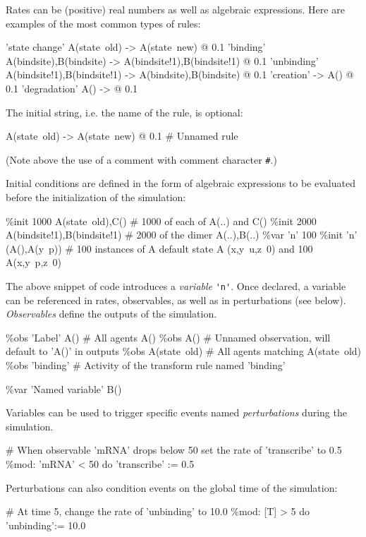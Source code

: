 \documentclass[english]{report}
\def\tbf#1{\textbf{#1}}
\begin{document}
Rates can be (positive) real numbers as well as algebraic expressions.
Here are examples of the most common types of rules:
%
%
\begin{kappasource}
'state change' A(state~old) -> A(state~new) @ 0.1
'binding'      A(bindsite),B(bindsite) -> A(bindsite!1),B(bindsite!1) @ 0.1
'unbinding'    A(bindsite!1),B(bindsite!1) -> A(bindsite),B(bindsite) @ 0.1
'creation'     -> A() @ 0.1
'degradation'  A() -> @ 0.1
\end{kappasource} 

The initial string, i.e. the name of the rule, is optional:
\begin{kappasource}
A(state~old) -> A(state~new) @ 0.1 # Unnamed rule
\end{kappasource} 
(Note above the use of a comment with comment character \Verb+#+.)

Initial conditions are defined in the form of algebraic expressions to be evaluated 
before the initialization of the simulation:
%
%
\begin{kappasource}
\%init 1000 A(state~old),C()            # 1000 of each of A(..) and C()
\%init 2000 A(bindsite!1),B(bindsite!1) # 2000 of the dimer A(..),B(..)
\%var  'n' 100
\%init 'n' (A(),A(y~p)) # 100 instances of A default state A (x,y~u,z~0) and 100 A(x,y~p,z~0) 
\end{kappasource} 
%
%

The above snippet of code introduces a \emph{variable} \Verb+'n'+. Once declared, a variable can be referenced in rates, observables, as well as in perturbations (see below). \emph{Observables} define the outputs of the simulation.

\begin{kappasource}
\%obs 'Label' A()  # All agents A()
\%obs A()          # Unnamed observation, will default to 'A()' in outputs
\%obs A(state~old) # All agents matching A(state~old)
\%obs 'binding'    # Activity of the transform rule named 'binding'

\%var 'Named variable' B()
\end{kappasource} 

Variables can be used to trigger specific events named \emph{perturbations} during 
the simulation.
\begin{kappasource}
# When observable 'mRNA' drops below 50 set the rate of 'transcribe' to 0.5
\%mod: 'mRNA' < 50 do 'transcribe' := 0.5
\end{kappasource} 
Perturbations can also condition events on the global time of the simulation:
%
%
\begin{kappasource}
# At time 5, change the rate of 'unbinding' to 10.0
\%mod: [T] > 5 do 'unbinding':= 10.0
\end{kappasource} 
\end{document}
